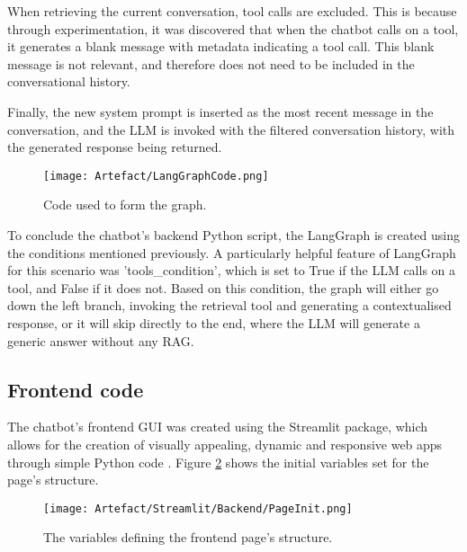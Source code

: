 \para When retrieving the current conversation, tool calls are excluded. This is because through experimentation,
it was discovered that when the chatbot calls on a tool, it generates a blank message with metadata indicating a
tool call. This blank message is not relevant, and therefore does not need to be included in the conversational history.

\para Finally, the new system prompt is inserted as the most recent message in the conversation, and the LLM
is invoked with the filtered conversation history, with the generated response being returned.

\begin{figure}[H]
    \centering
    \texttt{[image: Artefact/LangGraphCode.png]}
    \caption{Code used to form the graph. \label{fig:LangGraphCode}}
\end{figure}

\para To conclude the chatbot's backend Python script, the LangGraph is created using the conditions mentioned 
previously. A particularly helpful feature of LangGraph for this scenario was 'tools\_condition', which is
set to True if the LLM calls on a tool, and False if it does not. Based on this condition, the graph will either 
go down the left branch, invoking the retrieval tool and generating a contextualised response, or it will skip 
directly to the end, where the LLM will generate a generic answer without any RAG.


\newpage 

\subsection{Frontend code}\label{sec:ChatbotFrontend}
The chatbot's frontend GUI was created using the Streamlit package, which allows for the creation of visually appealing, dynamic and 
responsive web apps through simple Python code \autocite{streamlitStreamlitFasterWay2021}. Figure \ref{fig:StreamlitInitPage} shows 
the initial variables set for the page's structure.

\begin{figure}[H]
    \centering
    \texttt{[image: Artefact/Streamlit/Backend/PageInit.png]}
    \caption{The variables defining the frontend page's structure. \label{fig:StreamlitInitPage}}
\end{figure}

